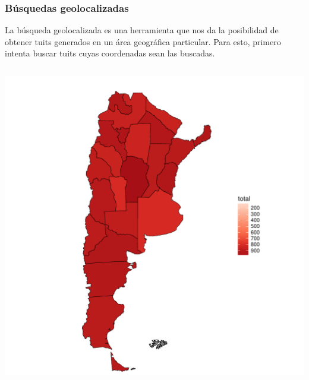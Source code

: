 
\begin{frame}[t]\frametitle{Búsquedas geolocalizadas}

La búsqueda geolocalizada es una herramienta que nos da la posibilidad de obtener tuits generados en un área geográfica particular. Para esto, primero intenta buscar tuits cuyas coordenadas sean las buscadas.


\begin{columns}
    \begin{column}{0.33\textwidth}
        \includegraphics[width=\linewidth]{../src/images/mapaprovincias.pdf}
        \caption{} 
        \label{fig:mapaProvincias}
    \end{column}


\end{columns}
\end{frame}
